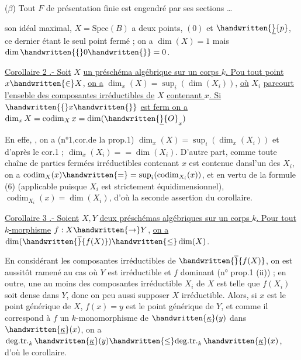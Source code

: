 ($\beta$) Tout $F$ de présentation finie est engendré par ses sections \ldots

son idéal maximal, $X=\mathrm{Spec}(B)$ a deux points, $(0)$ et $\handwritten{\underline}{p}$, ce dernier étant le seul point fermé ; on a $\dim(X)=1$ mais $\dim\handwritten{\{}0\handwritten{\}}=0$.

\uline{Corollaire 2 .- Soit} $X$ \uline{un préschéma algébrique sur un corps $k$. Pou tout point} $x\handwritten{\in}X$, \uline{on a} $\dim_x(X)=\sup_i(\dim(X_i))$\handwritten{\unsure{,|$^\circ$}}, \uline{où} $X_i$ \uline{parcourt l'enseble des composantes irréductibles de} $X$ \uline{contenant $x$. Si} $\handwritten{\{}x\handwritten{\}}$ \uline{est ferm on a} $\dim_x X=\operatorname{codim}_X x=\dim(\handwritten{\underline}{O}_x)$\handwritten{,} 

En effe, , on a (n°1,cor.de la prop.1) $\dim_x(X)=\sup_i(\dim_x(X_i))$ et  d'après le cor.1 ; $\dim_x(X_i)=\allowbreak=\dim(X_i)$. D'autre part, comme  toute chaîne de parties fermées irréductibles contenant $x$ est contenue dans\handwritten{\,}l'un des $X_i$, on a $\operatorname{codim}_X(x)\handwritten{=}\allowbreak=\sup_i(\operatorname{codim}_{X_i}(x))$, et en vertu de la formule (6) (applicable puisque $X_i$ est strictement équidimensionnel), $\operatorname{codim}_{X_i}(x)=\dim(X_i)$, d'où  la seconde assertion du corollaire.

\uline{Corollaire 3 .- Soient} $X,Y$ \uline{deux préschémas algébriques sur un corps $k$. Pour tout $k$-morphisme} $f:X\handwritten{\to}Y$, \uline{on a} $\dim(\handwritten{\overline}{f(X)})\handwritten{\leq}\dim(X)$.

En considérant les composantes irréductibles de $\handwritten{\overline}{f(X)}$, on est aussitôt ramené au cas où  $Y$ est irréductible et $f$ dominant (n° prop.1 (ii)) ; en outre, une au moins des composantes irréductible $X_i$ de $X$ est telle  que  $f(X_i)$ soit dense  dans $Y$, donc on peu aussi supposer $X$ irréductible. Alors, si $x$ est le point générique de $X$, $f(x)=y$ est le point générique de $Y$, et comme il  correspond à $f$ un $k$-monomorphisme de $\handwritten{\underline{\kappa}}(y)$ dans $\handwritten{\underline{\kappa}}(x)$, on a  $\mathrm{deg.tr.}_k\,\handwritten{\underline{\kappa}}(y)\handwritten{\leq}\mathrm{deg.tr.}_k\,\handwritten{\underline{\kappa}}(x)$, d'où le corollaire.


